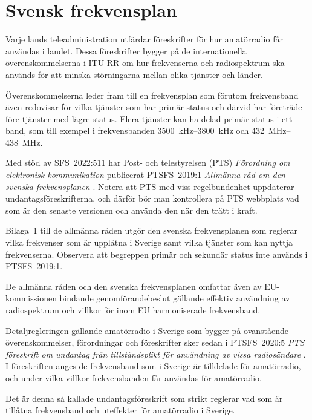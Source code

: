 \chapter{Svensk frekvensplan}
\label{svensk frekvensplan}

Varje lands teleadministration utfärdar föreskrifter för hur amatörradio får
användas i landet.
Dessa föreskrifter bygger på de internationella överenskommelserna i ITU-RR
\cite[ARTICLE 5]{ITU-RR} om hur frekvenserna och radiospektrum ska används för
att minska störningarna mellan olika tjänster och länder.

Överenskommelserna leder fram till en frekvensplan som förutom frekvensband även
redovisar för vilka tjänster som har primär status och därvid har företräde före
tjänster med lägre status.
Flera tjänster kan ha delad primär status i ett band, som till exempel i
frekvensbanden \SIrange{3500}{3800}{\kilo\hertz} och
\SIrange{432}{438}{\mega\hertz}.

Med stöd av SFS~2022:511 har Post- och telestyrelsen (PTS)
\emph{Förordning om elektronisk kommunikation} \cite{SFS2022:511}
publicerat PTSFS~2019:1 \emph{Allmänna råd om den svenska frekvensplanen}
\cite{PTSFS2019:1}.
Notera att PTS med viss regelbundenhet uppdaterar undantagsföreskrifterna,
och därför bör man kontrollera på PTS webbplats vad som är den senaste versionen
och använda den när den trätt i kraft.

Bilaga~1 till de allmänna råden utgör den svenska frekvensplanen som reglerar
vilka frekvenser som är upplåtna i Sverige samt vilka tjänster som kan nyttja
frekvenserna.
Observera att begreppen primär och sekundär status inte används i PTSFS~2019:1.

De allmänna råden och den svenska frekvensplanen omfattar även av
EU-kommissionen bindande genomförandebeslut gällande effektiv användning av
radiospektrum och villkor för inom EU harmoniserade frekvensband.

\newpage

Detaljregleringen gällande amatörradio i Sverige som bygger på ovanstående
överenskommelser, förordningar och föreskrifter sker sedan i PTSFS~2020:5
\emph{PTS föreskrift om undantag från tillståndsplikt för användning av vissa
  radiosändare} \cite{PTSFS2022:19}.
I föreskriften anges de frekvensband som i Sverige är tilldelade för
amatörradio, och under vilka villkor frekvensbanden får användas för
amatörradio.

Det är denna så kallade undantagsföreskrift som strikt reglerar vad som är
tillåtna frekvensband och uteffekter för amatörradio i Sverige.

